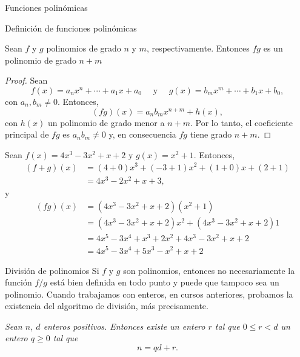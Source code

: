 \begin{chapter}{Funciones polinómicas}
\begin{section}{Definición de funciones polinómicas}
    \begin{proposicion}
        Sean $f$ y $g$ polinomios de grado $n$ y $m$,  respectivamente. Entonces $fg$ es un  polinomio de grado $n+m$
    \end{proposicion}
    \begin{proof}
        Sean
        \begin{equation*}
            f(x) = a_nx^n + \cdots + a_1x +a_0 \quad\text{ y } \quad g(x) = b_mx^m +\cdots + b_1x +b_0,
        \end{equation*}
        con $a_n, b_m \ne 0$. Entonces,
        \begin{equation}
            (fg)(x) = a_nb_m x^{n+m} + h(x),
        \end{equation}
        con $h(x)$ un polinomio de grado menor a $n+m$. Por lo tanto, el coeficiente principal de $fg$ es $a_nb_m \ne 0$ y,  en consecuencia $fg$ tiene grado $n+m$.
    \end{proof}

    \begin{ejemplo*} Sean $f(x) = 4x^3 - 3x^2 + x + 2$ y $g(x) = x^2 + 1$. Entonces,
        \begin{align*}
            (f+g)(x) & = (4+0)x^3 +(-3 +1)x^2 + (1+0)x + (2+1) \\
                     & = 4x^3 - 2x^2 + x + 3,
        \end{align*}
        y
        \begin{align*}
            (fg)(x) & = (4x^3 - 3x^2 + x + 2)(x^2 + 1)                    \\
                    & = (4x^3 - 3x^2 + x + 2)x^2 + (4x^3 - 3x^2 + x + 2)1 \\
                    & = 4x^5 - 3x^4 + x^3 + 2x^2 + 4x^3 - 3x^2 + x + 2    \\
                    & = 4x^5 - 3x^4 + 5x^3 - x^2 + x + 2
        \end{align*}
    \end{ejemplo*}

 \end{section}


 \begin{section}{División de polinomios}\label{seccion-division-de-polinomios} Si $f$ y $g$ son polinomios,  entonces no necesariamente la función $f/g$ está bien definida en todo punto y puede que tampoco sea un polinomio. Cuando trabajamos con enteros, en cursos anteriores,  probamos la existencia del algoritmo de división, más precisamente.

    \textit{Sean $n$, $d$ enteros positivos. Entonces existe un entero $r$ tal que
        $0 \le  r <d$  un entero $q \ge 0$ tal que
    }
    \begin{equation*}
        n = qd + r.
    \end{equation*}


\end{section}
\end{chapter}
